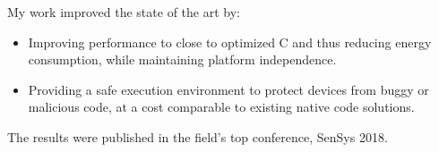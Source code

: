 \documentclass[10pt,a4paper]{../altacv}
\begin{document}
My work improved the state of the art by:
\begin{itemize}
    \item\small{Improving performance to close to optimized C and thus reducing energy consumption, while maintaining platform independence.}
    \item\small{Providing a safe execution environment to protect devices from buggy or malicious code, at a cost comparable to existing native code solutions.}
\end{itemize}

The results were published in the field's top conference, SenSys 2018.

\medskip


\medskip
\end{document}
